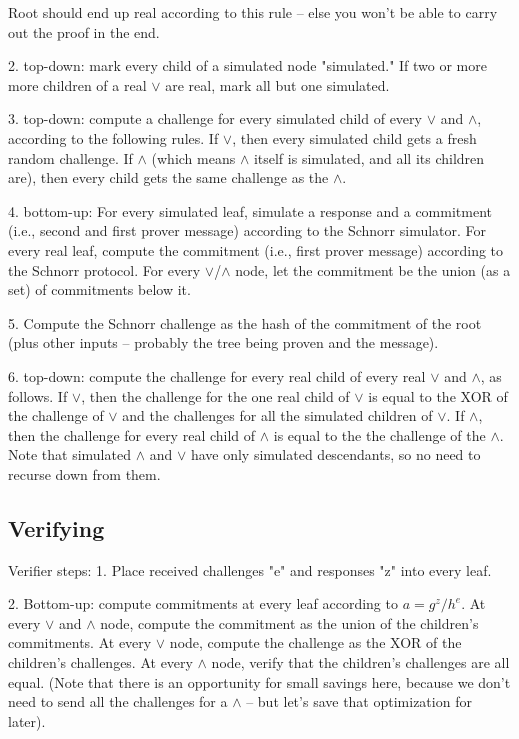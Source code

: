 \documentclass[11pt]{article}
\begin{document}
     Root should end up real according to this rule -- else you won't be able to carry out the proof in the end.
    
    2. top-down: mark every child of a simulated node "simulated." If two or more more children of a real $\lor$ are real,
     mark all but one simulated.
    
    3. top-down: compute a challenge for every simulated child of every $\lor$ and $\land$, according to the following rules.
     If $\lor$, then every simulated child gets a fresh random challenge. If $\land$ (which means $\land$ itself is simulated, and
     all its children are), then every child gets the same challenge as the $\land$.
    
    4. bottom-up: For every simulated leaf, simulate a response and a commitment (i.e., second and first prover message)
     according to the Schnorr simulator. For every real leaf, compute the commitment (i.e., first prover message) according
     to the Schnorr protocol. For every $\lor$/$\land$ node, let the commitment be the union (as a set) of commitments below it.
    
    5. Compute the Schnorr challenge as the hash of the commitment of the root (plus other inputs -- probably the tree
     being proven and the message).
    
    6. top-down: compute the challenge for every real child of every real $\lor$ and $\land$, as follows. If $\lor$, then the
     challenge for the one real child of $\lor$ is equal to the XOR of the challenge of $\lor$ and the challenges for all the
     simulated children of $\lor$. If $\land$, then the challenge for every real child of $\land$ is equal to the the challenge of
     the $\land$. Note that simulated $\land$ and $\lor$ have only simulated descendants, so no need to recurse down from them.

\subsection{Verifying}

Verifier steps:
    1. Place received challenges "e" and responses "z" into every leaf.

    2. Bottom-up: compute commitments at every leaf according to $a = g^z/h^e$. At every $\lor$ and $\land$ node, compute
      the commitment as the union of the children's commitments. At every $\lor$ node, compute the challenge as the XOR of
      the children's challenges. At every $\land$ node, verify that the children's challenges are all equal. (Note that
      there is an opportunity for small savings here, because we don't need to send all the challenges for a $\land$ --
      but let's save that optimization for later).
\end{document}
